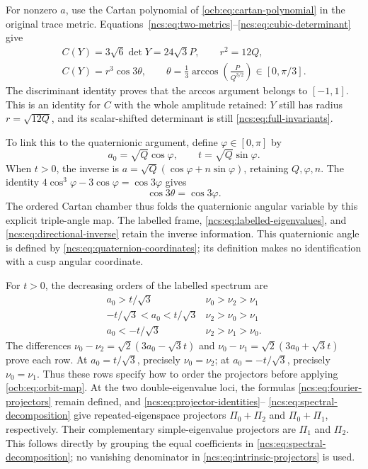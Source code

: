 \documentclass[11pt]{article}
\theoremstyle{definition}
\begin{document}
For nonzero $a$, use the Cartan polynomial of
\eqref{ocb:eq:cartan-polynomial} in the original trace metric.
Equations~\eqref{ncs:eq:two-metrics}--\eqref{ncs:eq:cubic-determinant}
give
\begin{equation}
 \begin{gathered}
 C(Y)=3\sqrt6\det Y=24\sqrt3P,\qquad r^2=12Q,\\
 \boxed{C(Y)=r^3\cos3\theta,\qquad
 \theta=\frac13\arccos\left(\frac{P}{Q^{3/2}}\right)
                              \in[0,\pi/3].}
 \end{gathered}
 \label{ncs:eq:cartan-angle}\tag{NCS17}
\end{equation}
The discriminant identity proves that the arccos argument belongs
to $[-1,1]$. This is an identity for $C$ with the whole amplitude
retained: $Y$ still has radius $r=\sqrt{12Q}$, and its scalar-shifted
determinant is still \eqref{ncs:eq:full-invariants}.

To link this to the quaternionic argument, define
$\varphi\in[0,\pi]$ by
\[
 a_0=\sqrt Q\cos\varphi,\qquad t=\sqrt Q\sin\varphi.
\]
When $t>0$, the inverse is
$a=\sqrt Q(\cos\varphi+n\sin\varphi)$, retaining
$Q,\varphi,n$. The identity
$4\cos^3\varphi-3\cos\varphi=\cos3\varphi$ gives
\begin{equation}
 \cos3\theta=\cos3\varphi.
 \label{ncs:eq:quaternion-angle}\tag{NCS18}
\end{equation}
The ordered Cartan chamber thus folds the quaternionic angular
variable by this explicit triple-angle map. The labelled frame,
\eqref{ncs:eq:labelled-eigenvalues}, and
\eqref{ncs:eq:directional-inverse} retain the inverse information.
This quaternionic angle is defined by
\eqref{ncs:eq:quaternion-coordinates}; its definition makes no
identification with a cusp angular coordinate.

For $t>0$, the decreasing orders of the labelled spectrum are
\begin{equation}
 \begin{array}{c|c}
 a_0>t/\sqrt3&\nu_0>\nu_2>\nu_1\\
 -t/\sqrt3<a_0<t/\sqrt3&\nu_2>\nu_0>\nu_1\\
 a_0<-t/\sqrt3&\nu_2>\nu_1>\nu_0.
 \end{array}
 \label{ncs:eq:ordered-chambers}\tag{NCS19}
\end{equation}
The differences
$\nu_0-\nu_2=\sqrt2(3a_0-\sqrt3t)$ and
$\nu_0-\nu_1=\sqrt2(3a_0+\sqrt3t)$ prove each row.
At $a_0=t/\sqrt3$, precisely $\nu_0=\nu_2$; at
$a_0=-t/\sqrt3$, precisely $\nu_0=\nu_1$. Thus these
rows specify how to order the projectors before applying
\eqref{ocb:eq:orbit-map}. At the two double-eigenvalue loci,
the formulas \eqref{ncs:eq:fourier-projectors} remain defined,
and \eqref{ncs:eq:projector-identities}--
\eqref{ncs:eq:spectral-decomposition} give repeated-eigenspace
projectors $\Pi_0+\Pi_2$ and $\Pi_0+\Pi_1$, respectively.
Their complementary simple-eigenvalue projectors are $\Pi_1$
and $\Pi_2$. This follows directly by grouping the equal
coefficients in \eqref{ncs:eq:spectral-decomposition}; no
vanishing denominator in \eqref{ncs:eq:intrinsic-projectors}
is used.
\end{document}
